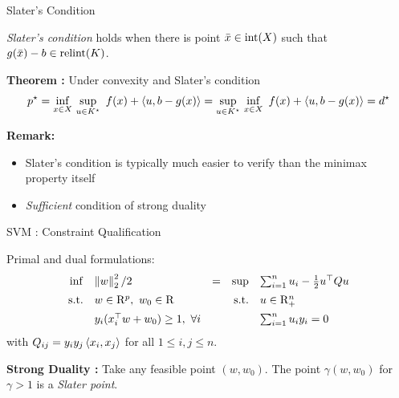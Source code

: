 \documentclass[9pt]{beamer}
\begin{document}
\begin{frame}{Slater's Condition}

  \emph{Slater's condition} holds when there is point $\bar x \in \operatorname{int}(X)$ such that $g(\bar x) - b \in \operatorname{relint}(K)$.

  \vfill
  
  \textbf{Theorem : } Under convexity and Slater's condition
  \[
    p^\star = \inf_{x\in X}\,\sup_{u\in K^\star}~f(x) + \left<u, b-g(x)\right> = \sup_{u\in K^\star}\,\inf_{x\in X}~f(x) + \left<u, b-g(x)\right> = d^\star
  \]

  \vfill

  \textbf{Remark:}
  \begin{itemize}
  \item Slater's condition is typically much easier to verify than the minimax property itself
  \item<2-> \emph{Sufficient} condition of strong duality 
  \end{itemize}
\end{frame}

\begin{frame}{SVM : Constraint Qualification}

  Primal and dual formulations:
  \[
    \begin{array}{rlcrl}
      \inf & \left\|w\right\|_2^2/2 & = & \sup & \sum_{i=1}^n u_i - \frac12 u^\top Q u \\[0.5em]
      \mathrm{s.t.} & w\in\mathrm{R}^p,~w_0\in\mathrm{R} & & \mathrm{s.t.} & u \in \mathrm{R}^n_+ \\[0.5em]
           & y_i(x_i^\top w + w_0) \geq 1,~ \forall i & & & \sum_{i=1}^n u_i y_i = 0
    \end{array}
  \]
  with $Q_{ij}=y_iy_j\left<x_i, x_j\right>$ for all $1\leq i, j\leq n$.
  

  \vfill

  \textbf{Strong Duality :} Take any feasible point $(w, w_0)$. The point $\gamma (w, w_0)$ for $\gamma>1$ is a \emph{Slater point}.
  
\end{frame}
\end{document}
